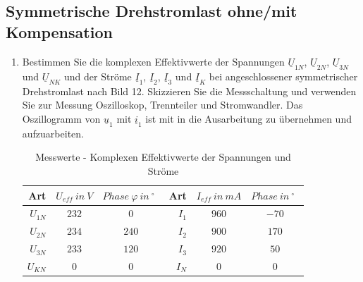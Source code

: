  	\subsection{Symmetrische Drehstromlast ohne/mit Kompensation}
	 	\begin{enumerate}[label=\alph*)]
	 		\item Bestimmen Sie die komplexen Effektivwerte der Spannungen $\underline{U}_{1N}$, $\underline{U}_{2N}$, $\underline{U}_{3N}$ und $\underline{U}_{NK}$ und der Ströme $\underline{I}_{1}$, $\underline{I}_{2}$, $\underline{I}_{3}$ und $\underline{I}_{K}$ bei angeschlossener symmetrischer Drehstromlast nach Bild 12. Skizzieren Sie die Messschaltung und verwenden Sie zur Messung Oszilloskop, Trennteiler und Stromwandler. Das Oszillogramm von $\underline{u}_{1}$ mit $\underline{i}_{1}$ ist mit in die Ausarbeitung zu übernehmen und aufzuarbeiten.
	 		 		
        \begin{table}[h!]
          \begin{center}
	 				\caption{Messwerte - Komplexen Effektivwerte der Spannungen und Ströme}
	 				\begin{tabular}{r c c r c c}
	 					\hline
	 					Art & \( U_{eff}\ in\ V \) & \( Phase\ \varphi\ in\ ^\circ\ \ \)  & Art & \( I_{eff}\ in\ mA \) & \( Phase\ in\ ^\circ\ \ \) \\
	 					\hline
	 					$U_{1N}$ & \( 232 \) & \( 0 \) &
	 					$I_{1}$	 & \( 960 \) & \( -70 \) \\
	 					$U_{2N}$ & \( 234 \) & \( 240 \) &
	 					$I_{2}$	 & \( 900 \) & \( 170 \) \\
	 					$U_{3N}$ & \( 233 \) & \( 120 \) &
	 					$I_{3}$	 & \( 920 \) & \( 50 \) \\
	 					$U_{KN}$ & \( 0   \) & \( 0 \) &
	 					$I_{N}$	 & \( 0   \) & \( 0 \) \\
	 					\hline
	 				\end{tabular}
	 		\end{center}
    \end{table}
	 		

\end{enumerate}

